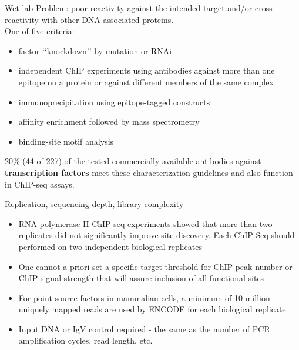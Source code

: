 \documentclass{beamer}
\begin{document}
\begin{frame}{Wet lab}
Problem: poor reactivity against the intended target and/or cross-reactivity with other DNA-associated proteins.\\
One of five criteria:
\begin{itemize}
\item factor ‘‘knockdown’’ by mutation or RNAi
\item independent ChIP experiments using antibodies against more than one epitope on a protein or against different members of the same complex
\item immunoprecipitation using epitope-tagged constructs
\item affinity enrichment followed by mass spectrometry
\item binding-site motif analysis
\end{itemize}
20\% (44 of 227) of the tested commercially available antibodies against \textbf{transcription factors} meet these characterization guidelines and also function in ChIP-seq assays.
\end{frame}

\begin{frame}{Replication, sequencing depth, library complexity}
\begin{itemize}
\item RNA polymerase II ChIP-seq experiments showed that more than two replicates did not significantly improve site discovery. Each ChIP-Seq should performed on two independent biological replicates
\item One cannot a priori set a specific target threshold for ChIP peak number or ChIP signal strength that will assure inclusion of all functional sites
\item For point-source factors in mammalian cells, a minimum of 10 million uniquely mapped reads are used by ENCODE for each biological replicate.
\item Input DNA or IgV control required - the same as the number of PCR amplification cycles, read length, etc.
\end{itemize}
\end{frame}
\end{document}
